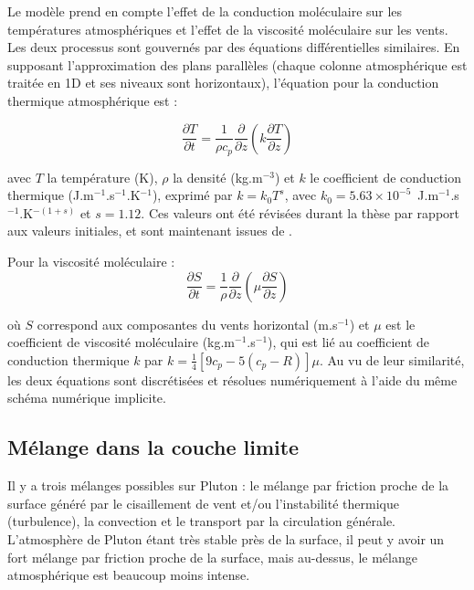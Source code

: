 Le modèle prend en compte l’effet de la conduction moléculaire sur les températures atmosphériques et l’effet de la viscosité moléculaire sur les vents. Les deux processus sont gouvernés par des équations différentielles similaires. En supposant l’approximation des plans parallèles (chaque colonne atmosphérique est traitée en 1D et ses niveaux sont horizontaux), l’équation pour la conduction thermique atmosphérique est : 

\begin{equation} 
\frac{\partial T}{\partial t}=\frac{1}{\rho c_p}\frac{\partial}{\partial z}\left(k\frac{\partial T}{\partial z}\right) 
\end{equation}

avec $T$ la température (K), $\rho$ la densité (kg.m$^{-3}$) et $k$ le coefficient de conduction thermique (J.m$^{-1}$.s$^{-1}$.K$^{-1}$), exprimé par $k = k_0 T^{s}$, avec $k_0 = 5.63\times10^{-5}$~J.m$^{-1}$.s$^{-1}$.K$^{-(1+s)}$  et $s=1.12$. Ces valeurs ont été révisées durant la thèse par rapport aux valeurs initiales, et sont maintenant issues de \citet{Hubb:90}.

Pour la viscosité moléculaire :
\begin{equation} 
\frac{\partial S}{\partial t}=\frac{1}{\rho}\frac{\partial}{\partial z}\left(\mu \frac{\partial S}{\partial z}\right) 
\end{equation}

où $S$ correspond aux composantes du vents horizontal (m.s$^{-1}$) et $\mu$ est le coefficient de viscosité moléculaire (kg.m$^{-1}$.s$^{-1}$), qui est lié au coefficient de conduction thermique $k$ par $k=\frac{1}{4}[9c_p-5(c_p-R)]\mu$. 
Au vu de leur similarité, les deux équations sont discrétisées et résolues numériquement à l’aide du même schéma numérique implicite. 

\subsection{Mélange dans la couche limite}
\label{sc:pbl}

Il y a trois mélanges possibles sur Pluton : le mélange par friction proche de la surface généré par le cisaillement de vent et/ou l'instabilité thermique (turbulence), la convection et le transport par la circulation générale. L’atmosphère de Pluton étant très stable près de la surface, il peut y avoir un fort mélange par friction proche de la surface, mais au-dessus, le mélange atmosphérique est beaucoup moins intense. 


